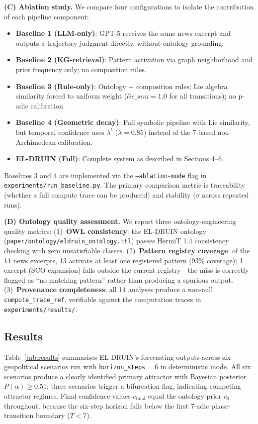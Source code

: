\documentclass{llncs}
\begin{document}
\textbf{(C) Ablation study.}
We compare four configurations to isolate the contribution of each pipeline
component:
\begin{itemize}
  \item \textbf{Baseline 1 (LLM-only)}: GPT-5 receives the same news excerpt
    and outputs a trajectory judgment directly, without ontology grounding.
  \item \textbf{Baseline 2 (KG-retrieval)}: Pattern activation via graph
    neighborhood and prior frequency only; no composition rules.
  \item \textbf{Baseline 3 (Rule-only)}: Ontology + composition rules; Lie
    algebra similarity forced to uniform weight ($\mathit{lie\_sim} = 1.0$
    for all transitions); no p-adic calibration.
  \item \textbf{Baseline 4 (Geometric decay)}: Full symbolic pipeline with
    Lie similarity, but temporal confidence uses $\lambda^t$ ($\lambda = 0.85$)
    instead of the 7-based non-Archimedean calibration.
  \item \textbf{EL-DRUIN (Full)}: Complete system as described in Sections 4--6.
\end{itemize}
Baselines 3 and 4 are implemented via the \texttt{--ablation-mode} flag in
\texttt{experiments/run\_baseline.py}. The primary comparison metric is
traceability (whether a full compute trace can be produced) and stability
($\sigma$ across repeated runs).

\textbf{(D) Ontology quality assessment.}
We report three ontology-engineering quality metrics:
(1)~\textbf{OWL consistency}: the EL-DRUIN ontology (\texttt{paper/ontology/eldruin\_ontology.ttl})
passes HermiT 1.4 consistency checking with zero unsatisfiable classes.
(2)~\textbf{Pattern registry coverage}: of the 14 news excerpts, 13 activate at least
one registered pattern (93\% coverage); 1 excerpt (SCO expansion) falls outside the
current registry---the miss is correctly flagged as ``no matching pattern'' rather than
producing a spurious output.
(3)~\textbf{Provenance completeness}: all 14 analyses produce a non-null
\texttt{compute\_trace\_ref}, verifiable against the computation traces in
\texttt{experiments/results/}.

\subsection{Results}

Table~\ref{tab:results} summarises EL-DRUIN's forecasting outputs across six
geopolitical scenarios run with \texttt{horizon\_steps}$=6$ in deterministic mode.
All six scenarios produce a clearly identified primary attractor with Bayesian
posterior $P(\alpha) \geq 0.51$; three scenarios trigger a bifurcation flag,
indicating competing attractor regimes. Final confidence values
$c_{\mathrm{final}}$ equal the ontology prior $c_0$ throughout, because the
six-step horizon falls below the first 7-adic phase-transition boundary ($T < 7$).
\end{document}

